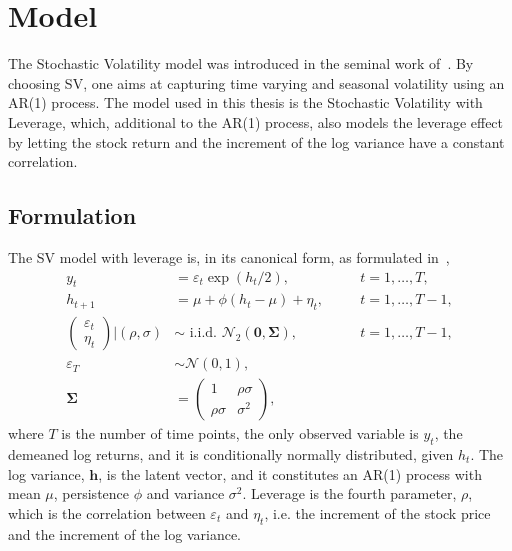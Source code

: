 \newcommand*{\yts}{y_t^\ast}
\newcommand*{\ets}{\varepsilon_t^\ast}

\section{Model}

The Stochastic Volatility model was introduced in the seminal work of~\citet{Taylor1982}.
By choosing SV, one aims at capturing time varying and seasonal volatility using an AR(1) process.
The model used in this thesis is the Stochastic Volatility with Leverage, which, additional to the AR(1) process, also models the leverage effect by letting the stock return and the increment of the log variance have a constant correlation.

\subsection{Formulation}

The SV model with leverage is, in its canonical form, as formulated in~\citet{Omori2007},
\begin{equation}
\begin{alignedat}{2}\label{form:orig_model}
y_t & = \varepsilon_t\exp\left(h_t/2\right), && \quad t=1,\dots,T, \\
h_{t+1} & = \mu+\phi(h_t-\mu)+\eta_t, && \quad t=1,\dots,T-1, \\
\begin{pmatrix}
\varepsilon_t \\
\eta_t
\end{pmatrix}
\bigg\vert\left(\rho,\sigma\right) & \sim\text{ i.i.d. }\mathcal{N}_2\left(\bm{0},\bm{\Sigma}\right), && \quad t=1,\dots,T-1, \\
\varepsilon_T &\sim\mathcal{N}(0,1), \\
\bm{\Sigma} & =
\begin{pmatrix}
1 & \rho\sigma \\
\rho\sigma & \sigma^2
\end{pmatrix},
\end{alignedat}
\end{equation}
where $T$ is the number of time points, the only observed variable is $y_t$, the demeaned log returns, and it is conditionally normally distributed, given $h_t$.
The log variance, $\bm{h}$, is the latent vector, and it constitutes an AR(1) process with mean $\mu$, persistence $\phi$ and variance $\sigma^2$.
Leverage is the fourth parameter, $\rho$, which is the correlation between $\varepsilon_t$ and $\eta_t$, i.e. the increment of the stock price and the increment of the log variance.

